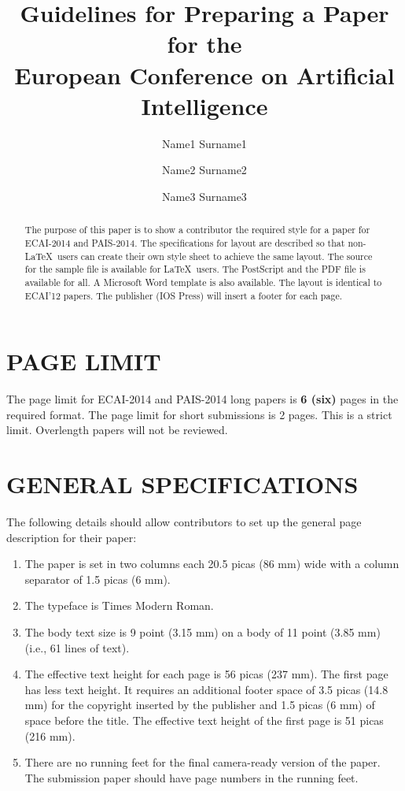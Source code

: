 \documentclass{ecai2014}
\begin{document}
\title{Guidelines for Preparing a Paper for the \\
European Conference on Artificial Intelligence}

\author{Name1 Surname1 \and Name2 Surname2 \and Name3 Surname3 }

\maketitle


\begin{abstract}
  The purpose of this paper is to show a contributor the required
  style for a paper for ECAI-2014 and PAIS-2014. The specifications
  for layout are described so that non-\LaTeX\ users can create their
  own style sheet to achieve the same layout. The source for the
  sample file is available for \LaTeX\ users. The PostScript and the
  PDF file is available for all. A Microsoft Word template is also available.
 The layout is identical to ECAI'12
  papers. The publisher (IOS Press) will insert a footer for each
  page.
\end{abstract}

\section{PAGE LIMIT}
The page limit for ECAI-2014 and PAIS-2014 long papers is \textbf{6
  (six)} pages in the required format. The page limit for short
submissions is 2 pages. This is a strict limit. Overlength papers will
not be reviewed.

\section{GENERAL SPECIFICATIONS}
The following details should allow contributors to set up the general
page description for their paper:

\begin{enumerate}
\item The paper is set in two columns each 20.5 picas (86 mm) wide
  with a column separator of 1.5 picas (6 mm).

\item The typeface is Times Modern Roman.

\item The body text size is 9 point (3.15 mm) on a body of 11
point (3.85 mm) (i.e., 61 lines of text).

\item The effective text height for each page is 56 picas (237 mm).
The first page has less text height. It requires an additional footer
space of 3.5 picas (14.8 mm) for the copyright inserted by the publisher
and 1.5 picas (6 mm) of space before the title.
The effective text height of the first page is 51 picas (216 mm).

\item There are no running feet for the final camera-ready version of the
paper. The submission paper should have page numbers in the running feet.

\end {enumerate}
\end{document}
